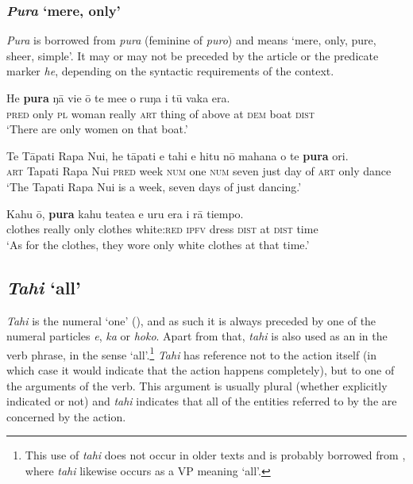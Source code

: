 \subsubsection{\textit{Pura} ‘mere, only’}\label{sec:4.4.8.3}
\textit{Pura} is borrowed from  \textit{pura} (feminine of \textit{puro}) and means ‘mere, only, pure, sheer, simple’. It may or may not be preceded by the article or the predicate marker \textit{he}, depending on the syntactic requirements of the context.

\ea\label{ex:4.114}
\gll He \textbf{pura} ŋā vi{\ꞌ}e {\ꞌ}ō te me{\ꞌ}e o ruŋa i tū vaka era. \\
\textsc{pred} only \textsc{pl} woman really \textsc{art} thing of above at \textsc{dem} boat \textsc{dist} \\

\glt 
‘There are only women on that boat.’ \textstyleExampleref{[R416.513]} 
\z

\ea\label{ex:4.115}
\gll Te Tāpati Rapa Nui, he tāpati e tahi e hitu nō mahana o te \textbf{pura} {\ꞌ}ori.\\
\textsc{art} Tapati Rapa Nui \textsc{pred} week \textsc{num} one \textsc{num} seven just day of \textsc{art} only dance\\

\glt 
‘The Tapati Rapa Nui is a week, seven days of just dancing.’ \textstyleExampleref{[R240.003]}  
\z

\ea\label{ex:4.116}
\gll Kahu {\ꞌ}ō, \textbf{pura} kahu teatea e uru era {\ꞌ}i rā tiempo. \\
clothes really only clothes white:\textsc{red} \textsc{ipfv} dress \textsc{dist} at \textsc{dist} time \\

\glt 
‘As for the clothes, they wore only white clothes at that time.’ \textstyleExampleref{[R416.1272]}
\z

\subsection{\textit{Tahi} ‘all’}\label{sec:4.4.9}
\textit{Tahi} is the numeral ‘one’ (), and as such it is always preceded by one of the numeral particles \textit{e}, \textit{ka} or \textit{hoko}. Apart from that, \textit{tahi} is also used as an  in the verb phrase, in the sense ‘all’.\footnote{\label{fn:189}This use of \textit{tahi} does not occur in older texts and is probably borrowed from , where \textit{tahi} likewise occurs as a VP  meaning ‘all’.} \textit{Tahi} has reference not to the action itself (in which case it would indicate that the action happens completely), but to one of the arguments of the verb. This argument is usually plural (whether explicitly indicated or not) and \textit{tahi} indicates that all of the entities referred to by the  are concerned by the action.


